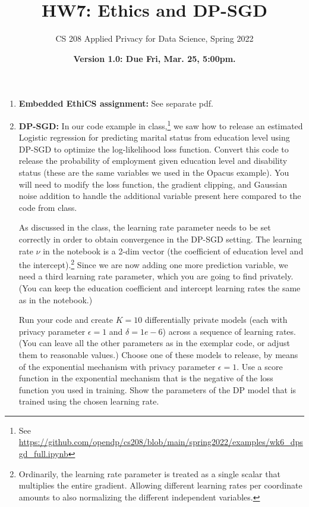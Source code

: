 \documentclass[11pt]{article}
\title{\vspace{-1.5cm} HW7: Ethics and DP-SGD}
\author{CS 208 Applied Privacy for Data Science, Spring 2022}
\date{\textbf{Version 1.0: Due Fri, Mar. 25, 5:00pm.}}
\theoremstyle{plain}
\theoremstyle{definition}
\theoremstyle{solution}
\begin{document}
\maketitle

\begin{enumerate}
    \item \textbf{Embedded EthiCS assignment:}
    See separate pdf.
    
    \item \textbf{DP-SGD:}
    In our code example in class,\footnote{See \url{https://github.com/opendp/cs208/blob/main/spring2022/examples/wk6_dpsgd_full.ipynb}} 
    we saw how to release an estimated Logistic regression for predicting marital status from education level using DP-SGD to optimize the log-likelihood loss function.  Convert this code to release the probability of employment given education level and disability status (these are the same variables we used in the Opacus example). You will need to modify the loss function, the gradient clipping, and Gaussian noise addition to handle the additional variable present here compared to the code from class.

    
    As discussed in the class, the learning rate parameter needs to be set correctly in order to obtain convergence in the DP-SGD setting. 
    The learning rate $\nu$ in the notebook is a 2-dim vector (the coefficient of education level and the intercept).\footnote{Ordinarily,
    the learning rate parameter is treated as a single scalar that multiplies the entire gradient.  Allowing different learning rates per coordinate amounts to also normalizing the different independent variables.}
    Since we are
    now adding one more prediction variable, we need a third learning rate parameter, which you are going to find privately.  (You can keep the education coefficient and intercept learning rates the same as in the notebook.)

    Run your code and create $K=10$ differentially private models (each with privacy parameter $\epsilon=1$ and $\delta=1e-6$) across a sequence of learning rates.  (You can leave all the other parameters as in the exemplar code, or adjust them to reasonable values.) Choose one of these models to release, by means of the exponential mechanism with privacy parameter $\epsilon=1$.  Use a score function in the exponential mechanism that is the negative of the loss function you used in training. Show the parameters of the DP model that is trained using the chosen learning rate. 
    

\end{enumerate}
\end{document}

